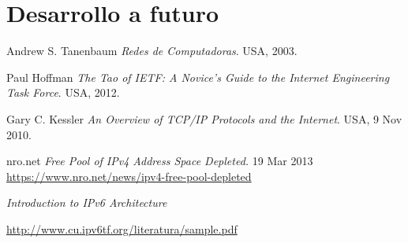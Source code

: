 \documentclass[11pt,a4paper]{article}
\begin{document}
\section{Desarrollo a futuro}

\newpage
\begin{thebibliography}{9}

  Andrew S. Tanenbaum
  \emph{Redes de Computadoras}.
  USA,
  2003.

  Paul Hoffman
  \emph{The Tao of IETF: A Novice's Guide to the Internet Engineering Task Force}.
  USA,
  2012.
		
  Gary C. Kessler
  \emph{An Overview of TCP/IP Protocols and the Internet}.
  USA,
  9 Nov 2010.
		
 nro.net
 \emph{Free Pool of IPv4 Address Space Depleted.} 
 19 Mar 2013\\
	\url{https://www.nro.net/news/ipv4-free-pool-depleted}	


 \emph{Introduction to IPv6 Architecture} 

	\url{http://www.cu.ipv6tf.org/literatura/sample.pdf}		
		
\end{thebibliography}
\end{document}
